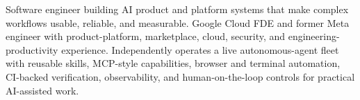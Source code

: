 


Software engineer building AI product and platform systems that make complex workflows usable, reliable, and measurable. Google Cloud FDE and former Meta engineer with product-platform, marketplace, cloud, security, and engineering-productivity experience. Independently operates a live autonomous-agent fleet with reusable skills, MCP-style capabilities, browser and terminal automation, CI-backed verification, observability, and human-on-the-loop controls for practical AI-assisted work.







